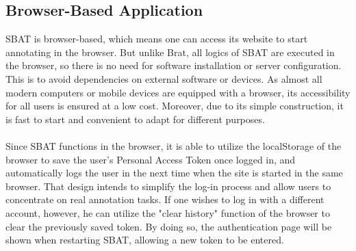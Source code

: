 \documentclass[12ptm a4paper]{article}
\begin{document}
\subsection{Browser-Based Application}
SBAT is browser-based, which means one can access its website to start annotating in the browser. But unlike Brat, all logics of SBAT are executed in the browser, so there is no need for software installation or server configuration. This is to avoid dependencies on external software or devices. As almost all modern computers or mobile devices are equipped with a browser, its accessibility for all users is ensured at a low cost. Moreover, due to its simple construction, it is fast to start and convenient to adapt for different purposes.\\
\\
Since SBAT functions in the browser, it is able to utilize the localStorage of the browser to save the user's Personal Access Token once logged in, and automatically logs the user in the next time when the site is started in the same browser. That design intends to simplify the log-in process and allow users to concentrate on real annotation tasks. If one wishes to log in with a different account, however, he can utilize the "clear history" function of the browser to clear the previously saved token. By doing so, the authentication page will be shown when restarting SBAT, allowing a new token to be entered.
\end{document}
